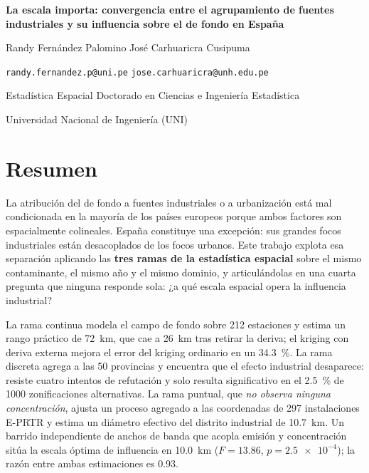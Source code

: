 \documentclass[11pt,a4paper]{article}
\begin{document}
\begin{center}
{\Large\bfseries\color{azul} La escala importa: convergencia entre el
agrupamiento de fuentes industriales y su influencia sobre el  de
fondo en España\par}

\vspace{8pt}
{\normalsize Randy Fernández Palomino \quad\textperiodcentered\quad
José Carhuaricra Cusipuma\par}
\vspace{3pt}
{\small\texttt{randy.fernandez.p@uni.pe} \quad\textperiodcentered\quad
\texttt{jose.carhuaricra@unh.edu.pe}\par}
\vspace{3pt}
{\small Estadística Espacial \quad\textperiodcentered\quad Doctorado en
Ciencias e Ingeniería Estadística\par}
{\small Universidad Nacional de Ingeniería (UNI) \quad\textperiodcentered{}\par}
\end{center}

\vspace{6pt}

\section{Resumen}

La atribución del  de fondo a fuentes industriales o a urbanización
está mal condicionada en la mayoría de los países europeos porque ambos
factores son espacialmente colineales. España constituye una excepción: sus
grandes focos industriales están desacoplados de los focos urbanos. Este
trabajo explota esa separación aplicando las \textbf{tres ramas de la
estadística espacial} sobre el mismo contaminante, el mismo año y el mismo
dominio, y articulándolas en una cuarta pregunta que ninguna responde sola:
¿a qué escala espacial opera la influencia industrial?

La rama continua modela el campo de fondo sobre \num{212} estaciones y estima
un rango práctico de \SI{72}{\kilo\metre}, que cae a \SI{26}{\kilo\metre} tras
retirar la deriva; el kriging con deriva externa mejora el error del kriging
ordinario en un \SI{34.3}{\percent}. La rama discreta agrega a las \num{50}
provincias y encuentra que el efecto industrial desaparece: resiste cuatro
intentos de refutación y solo resulta significativo en el \SI{2.5}{\percent} de
\num{1000} zonificaciones alternativas. La rama puntual, que \emph{no observa
ninguna concentración}, ajusta un proceso agregado a las coordenadas de
\num{297} instalaciones E-PRTR y estima un diámetro efectivo del distrito
industrial de \SI{10.7}{\kilo\metre}. Un barrido independiente de anchos de
banda que acopla emisión y concentración sitúa la escala óptima de influencia
en \SI{10.0}{\kilo\metre} ($F = \num{13.86}$, $p = \num{2.5e-4}$); la razón
entre ambas estimaciones es \num{0.93}.
\end{document}
